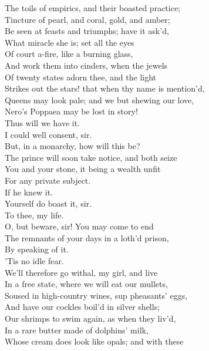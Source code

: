 \documentclass{memoir}
\begin{document}
\begin{drama*}
 The toils of empirics, and their boasted practice;\\
 Tincture of pearl, and coral, gold, and amber;\\
 Be seen at feasts and triumphs; have it ask'd,\\
 What miracle she is; set all the eyes\\
 Of court a-fire, like a burning glass,\\
 And work them into cinders, when the jewels\\
 Of twenty states adorn thee, and the light\\
 Strikes out the stars! that when thy name is mention'd,\\
 Queens may look pale; and we but shewing our love,\\
 Nero's Poppaea may be lost in story!\\
 Thus will we have it.\\
\dolspeaks {} I could well consent, sir.\\
 But, in a monarchy, how will this be?\\
 The prince will soon take notice, and both seize\\
 You and your stone, it being a wealth unfit\\
 For any private subject.\\
\mammonspeaks {} If he knew it.\\
\dolspeaks  Yourself do boast it, sir.\\
\mammonspeaks {} To thee, my life.\\
\dolspeaks  O, but beware, sir! You may come to end\\
 The remnants of your days in a loth'd prison,\\
 By speaking of it.\\
\mammonspeaks {} 'Tis no idle fear.\\
 We'll therefore go withal, my girl, and live\\
 In a free state, where we will eat our mullets,\\
 Soused in high-country wines, sup pheasants' eggs,\\
 And have our cockles boil'd in silver shells;\\
 Our shrimps to swim again, as when they liv'd,\\
 In a rare butter made of dolphins' milk,\\
 Whose cream does look like opals; and with these\\

\end{drama*}
\end{document}
